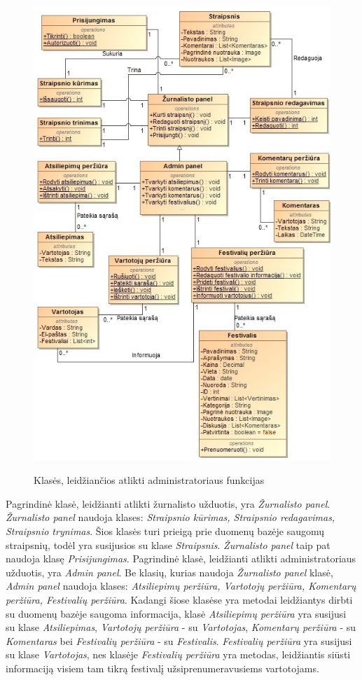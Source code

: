 ﻿\documentclass{VUMIFPSkursinis}
\begin{document}
\begin{figure}[H]
\centering
    \includegraphics[scale=0.65]{img/PSI3/admin}
	\label{img:uml18}
	\caption{Klasės, leidžiančios atlikti administratoriaus funkcijas}
\end{figure}
Pagrindinė klasė, leidžianti atlikti žurnalisto užduotis, yra \textit{Žurnalisto panel}. \textit{Žurnalisto panel} naudoja klases: \textit{Straipsnio kūrimas, Straipsnio redagavimas, Straipsnio trynimas}. Šios klasės turi prieigą prie duomenų bazėje saugomų straipsnių, todėl yra susijusios su klase \textit{Straipsnis}. \textit{Žurnalisto panel} taip pat naudoja klasę \textit{Prisijungimas}.
Pagrindinė klasė, leidžianti atlikti administratoriaus užduotis, yra \textit{Admin panel}. Be klasių, kurias naudoja \textit{Žurnalisto panel} klasė, \textit{Admin panel} naudoja klases: \textit{Atsiliepimų peržiūra, Vartotojų peržiūra, Komentarų peržiūra, Festivalių peržiūra}. Kadangi šiose klasėse yra metodai leidžiantys dirbti su duomenų bazėje saugoma informacija, klasė \textit{Atsiliepimų peržiūra} yra susijusi su klase \textit{Atsiliepimas}, \textit{Vartotojų peržiūra} - su \textit{Vartotojas}, \textit{Komentarų peržiūra} - su \textit{Komentaras} bei \textit{Festivalių peržiūra} - su \textit{Festivalis}. \textit{Festivalių peržiūra} yra susijusi su klase \textit{Vartotojas}, nes klasėje \textit{Festivalių peržiūra} yra metodas, leidžiantis siūsti informaciją visiem tam tikrą festivalį užsiprenumeravusiems vartotojams.
\end{document}
